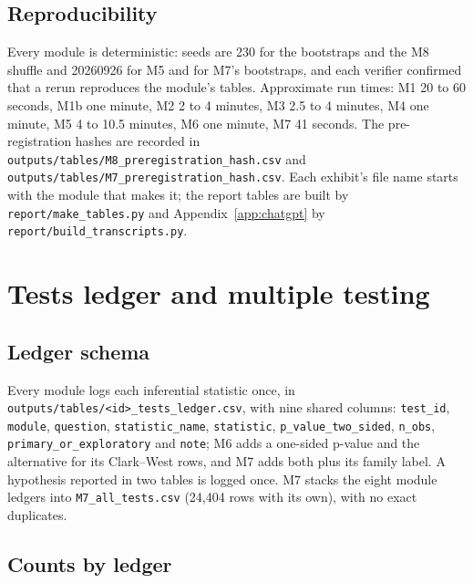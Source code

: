 \subsection{Reproducibility}
Every module is deterministic: seeds are 230 for the bootstraps and the M8 shuffle and 20260926 for M5 and for M7's bootstraps, and each verifier confirmed that a rerun reproduces the module's tables. Approximate run times: M1 20 to 60 seconds, M1b one minute, M2 2 to 4 minutes, M3 2.5 to 4 minutes, M4 one minute, M5 4 to 10.5 minutes, M6 one minute, M7 41 seconds. The pre-registration hashes are recorded in \texttt{outputs/tables/M8\_preregistration\_hash.csv} and \texttt{outputs/tables/M7\_preregistration\_hash.csv}. Each exhibit's file name starts with the module that makes it; the report tables are built by \texttt{report/make\_tables.py} and Appendix~\ref{app:chatgpt} by \texttt{report/build\_transcripts.py}.

\clearpage
\section{Tests ledger and multiple testing}
\label{app:ledger}

\subsection{Ledger schema}
{\raggedright Every module logs each inferential statistic once, in \texttt{outputs/tables/<id>\_tests\_ledger.csv}, with nine shared columns: \texttt{test\_id}, \texttt{module}, \texttt{question}, \texttt{statistic\_name}, \texttt{statistic}, \texttt{p\_value\_two\_sided}, \texttt{n\_obs}, \texttt{primary\_or\_exploratory} and \texttt{note}; M6 adds a one-sided p-value and the alternative for its Clark--West rows, and M7 adds both plus its family label. A hypothesis reported in two tables is logged once. M7 stacks the eight module ledgers into \texttt{M7\_all\_tests.csv} (24,404 rows with its own), with no exact duplicates.\par}

\subsection{Counts by ledger}
\begin{table}[H]
\caption{Rows in each tests ledger, by label. Only primary rows form pre-specified families; M7's one primary row is the frozen 1931--1969 test.}
\label{tab:ledgers}
\centering\small

\end{table}

